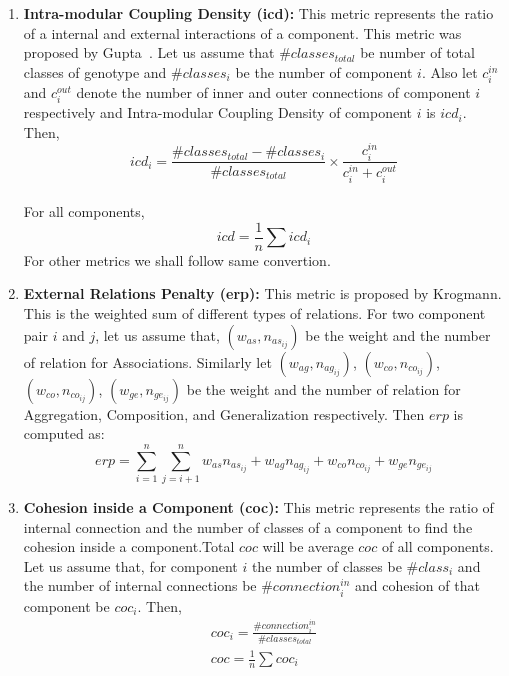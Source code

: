 \documentclass[letterpaper, 10 pt, conference]{ieeeconf}  %
\begin{document}
\begin{enumerate}
\item \textbf{Intra-modular Coupling Density (icd):} This metric represents the ratio of a internal and external interactions of a component. This metric was proposed by Gupta~\cite{gupta2012optimization}. Let us assume that $\#classes_{total}$ be number of total classes of genotype and $\#classes_{i}$ be the number of component $i$. Also let $c^{in}_i$ and $c^{out}_i$ denote the number of inner and outer connections of component $i$ respectively and  Intra-modular Coupling Density of component $i$ is $icd_{i}$. Then,
\begin{equation}\label{icd_eq_i}
icd_{i}=\frac{\#classes_{total}-\#classes_{i}}{\#classes_{total}}\times\frac{c^{in}_i}{c^{in}_i+c^{out}_i} 
\end{equation}\\
For all components,
\begin{equation}\label{icd_eq}
icd=\frac{1}{n}\sum{icd_{i}}
\end{equation}
For other metrics we shall follow same convertion.

\item \textbf{External Relations Penalty (erp):} This metric is proposed by Krogmann\cite{krogmann2012reconstruction}. This is the weighted sum of different types of relations. For two component pair $i$ and $j$, let us assume that, $(w_{as},n_{as_{ij}})$ be the weight and the number of relation for Associations. Similarly let $(w_{ag},n_{ag_{ij}})$, $(w_{co}, n_{co_{ij}})$, $(w_{co} ,n_{co_{ij}})$, $(w_{ge},n_{ge_{ij}})$ be  the weight and the number of relation for Aggregation, Composition, and Generalization respectively. Then $erp$ is computed as:
\begin{equation}\label{erp_eq}
 erp=\sum_{i=1}^{n}{\sum_{j=i+1}^{n}}{w_{as}n_{as_{ij}}+w_{ag}n_{ag_{ij}}+w_{co}n_{co_{ij}}+w_{ge}n_{ge_{ij}}}
\end{equation}

\item \textbf{Cohesion inside a Component (coc):}
This metric represents the ratio of internal connection and the number of classes of a component to find the cohesion inside a component.Total $coc$ will be average $coc$ of all components. Let us assume that, for component $i$ the number of classes be $\#class_{i}$ and  the number of internal connections be $\#connection^{in}_{i}$ and cohesion of that component be $coc_{i}$. Then,
\begin{equation}\label{coc_eq}
 \begin{array}{l}
coc_{i}=\frac{\#connection^{in}_{i}}{\#classes_{total}} \\
coc=\frac{1}{n}\sum{coc_{i}}
\end{array}
\end{equation}


\end{enumerate}
\end{document}
